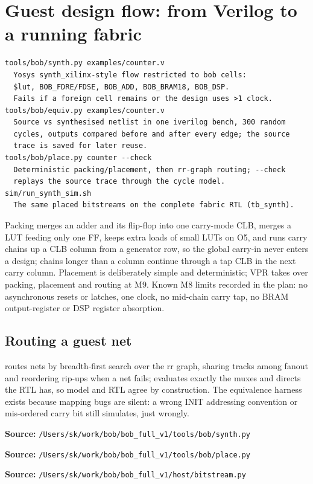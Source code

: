 \documentclass[11pt,a4paper]{article}
\newcommand{\code}[1]{\texttt{\detokenize{#1}}}
\newcommand{\src}[1]{\par\smallskip\noindent\textbf{Source: }\nolinkurl{/Users/sk/work/bob/bob_full_v1/#1}\par\smallskip}
\begin{document}
\section{Guest design flow: from Verilog to a running fabric}
\label{sec:flow}
\begin{lstlisting}[caption={M8 flow: each step has a proof obligation}]
tools/bob/synth.py examples/counter.v
  Yosys synth_xilinx-style flow restricted to bob cells:
  $lut, BOB_FDRE/FDSE, BOB_ADD, BOB_BRAM18, BOB_DSP.
  Fails if a foreign cell remains or the design uses >1 clock.
tools/bob/equiv.py examples/counter.v
  Source vs synthesised netlist in one iverilog bench, 300 random
  cycles, outputs compared before and after every edge; the source
  trace is saved for later reuse.
tools/bob/place.py counter --check
  Deterministic packing/placement, then rr-graph routing; --check
  replays the source trace through the cycle model.
sim/run_synth_sim.sh
  The same placed bitstreams on the complete fabric RTL (tb_synth).
\end{lstlisting}
Packing merges an adder and its flip-flop into one carry-mode CLB, merges a LUT
feeding only one FF, keeps extra loads of small LUTs on O5, and runs carry
chains up a CLB column from a generator row, so the global carry-in never enters
a design; chains longer than a column continue through a tap CLB in the next
carry column. Placement is deliberately simple and deterministic; VPR takes over
packing, placement and routing at M9. Known M8 limits recorded in the plan: no
asynchronous resets or latches, one clock, no mid-chain carry tap, no BRAM
output-register or DSP register absorption.
\subsection{Routing a guest net}
\code{host/bitstream.py} routes nets by breadth-first search over the rr graph,
sharing tracks among fanout and reordering rip-ups when a net fails;
\code{tools/bob/model.py} evaluates exactly the muxes and directs the RTL has,
so model and RTL agree by construction. The equivalence harness exists because
mapping bugs are silent: a wrong INIT addressing convention or mis-ordered
carry bit still simulates, just wrongly.
\src{tools/bob/synth.py}
\src{tools/bob/place.py}
\src{host/bitstream.py}
\end{document}
